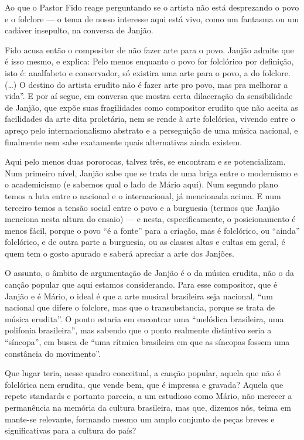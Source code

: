 Ao que o Pastor Fido reage perguntando se o artista não está desprezando
o povo e o folclore --- o tema de nosso interesse aqui está vivo, como um
fantasma ou um cadáver insepulto, na conversa de Janjão.

Fido acusa então o compositor de não fazer arte para o povo. Janjão
admite que é isso mesmo, e explica: Pelo menos enquanto o povo for
folclórico por definição, isto é: analfabeto e conservador, só existira
uma arte para o povo, a do folclore. (\ldots{}) O destino do artista erudito
não é fazer arte pro povo, mas pra melhorar a vida''. E por aí segue, em
conversa que mostra certa dilaceração da sensibilidade de Janjão, que
expõe suas fragilidades como compositor erudito que não aceita as
facilidades da arte dita proletária, nem se rende à arte folclórica,
vivendo entre o apreço pelo internacionalismo abstrato e a perseguição
de uma música nacional, e finalmente nem sabe exatamente quais
alternativas ainda existem.

Aqui pelo menos duas pororocas, talvez três, se encontram e se
potencializam. Num primeiro nível, Janjão sabe que se trata de uma briga
entre o modernismo e o academicismo (e sabemos qual o lado de Mário
aqui). Num segundo plano temos a luta entre o nacional e o
internacional, já mencionada acima. E num terceiro temos a tensão social
entre o povo e a burguesia (termos que Janjão menciona nesta altura do
ensaio) --- e nesta, especificamente, o posicionamento é menos fácil,
porque o povo ``é a fonte'' para a criação, mas é folclórico, ou
``ainda'' folclórico, e de outra parte a burguesia, ou as classes altas
e cultas em geral, é quem tem o gosto apurado e saberá apreciar a arte
dos Janjões.

O assunto, o âmbito de argumentação de Janjão é o da música erudita, não
o da canção popular que aqui estamos considerando. Para esse compositor,
que é Janjão e é Mário, o ideal é que a arte musical brasileira seja
nacional, ``um nacional que difere o folclore, mas que o transubstancia,
porque se trata de música erudita''. O ponto estaria em encontrar uma
``melódica brasileira, uma polifonia brasileira'', mas sabendo que o
ponto realmente distintivo seria a ``síncopa'', em busca de ``uma
rítmica brasileira em que as síncopas fossem uma constância do
movimento''.

Que lugar teria, nesse quadro conceitual, a canção popular, aquela que
não é folclórica nem erudita, que vende bem, que é impressa e gravada?
Aquela que repete standards e portanto parecia, a um estudioso como
Mário, não merecer a permanência na memória da cultura brasileira, mas
que, dizemos nós, teima em mante-se relevante, formando mesmo um amplo
conjunto de peças breves e significativas para a cultura do país?

